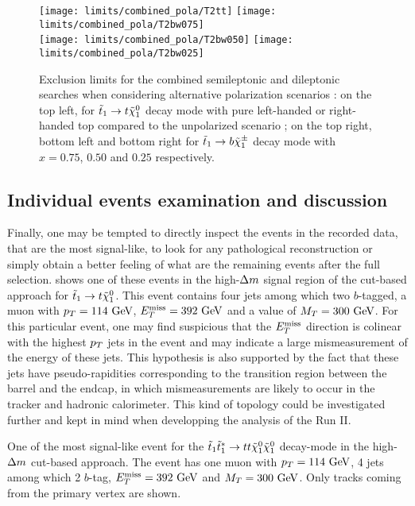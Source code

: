     \begin{figure}[h!]
        \centering
        \texttt{[image: limits/combined\_pola/T2tt]}
        \texttt{[image: limits/combined\_pola/T2bw075]}\\
        \texttt{[image: limits/combined\_pola/T2bw050]}
        \texttt{[image: limits/combined\_pola/T2bw025]}\\
        \caption{Exclusion limits for the combined semileptonic and dileptonic searches
        when considering alternative polarization scenarios : on the top left, for $\tilde{t}_1
        \rightarrow t \tilde{\chi}_1^0$ decay mode with pure left-handed or right-handed top
        compared to the unpolarized scenario ; on the top right, bottom left and bottom
        right for $\tilde{t}_1 \rightarrow b \tilde{\chi}_1^\pm$ decay mode with $x=0.75$, $0.50$ and
        $0.25$ respectively.}
        \label{fig:resultsCombinedPolarized}
    \end{figure}

    \subsection{Individual events examination and discussion}

    Finally, one may be tempted to directly inspect the events in the recorded data, that are the
    most signal-like, to look for any pathological reconstruction or simply obtain a
    better feeling of what are the remaining events after the full selection. 
    shows one of these events in the high-$\Delta m$ signal region of the cut-based approach
    for $\tilde{t}_1 \rightarrow t \tilde{\chi}_1^0$. This event contains four jets among which
    two $b$-tagged, a muon with $p_T = 114~\text{GeV}$, $E_T^\text{miss} = 392~\text{GeV}$ and a value of $M_T =
    300~\text{GeV}$. For this particular event, one may find suspicious that the $E_T^\text{miss}$ direction
    is colinear with the highest $p_T$ jets in the event and may indicate a large mismeasurement
    of the energy of these jets. This hypothesis is also supported by the fact that these
    jets have pseudo-rapidities corresponding to the transition region between the barrel
    and the endcap, in which mismeasurements are likely to occur in the tracker and hadronic
    calorimeter. This kind of topology could be investigated further and kept in mind when
    developping the analysis of the Run II.

    {One of the most signal-like event for the $\tilde{t}_1 \tilde{t}_1^{*} \rightarrow t t \tilde{\chi}_1^0 \tilde{\chi}_1^0$
    decay-mode in the high-$\Delta m$ cut-based approach. The event has one muon with
    $p_T = 114~\text{GeV}$, 4 jets among which 2 $b$-tag, $E_T^\text{miss} = 392~\text{GeV}$ and $M_T = 300 ~\text{GeV}$.
    Only tracks coming from the primary vertex are shown.}

